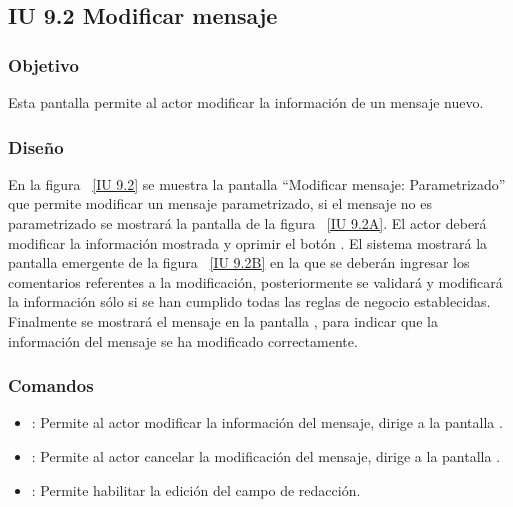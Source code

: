 \subsection{IU 9.2 Modificar mensaje}

\subsubsection{Objetivo}
	
	Esta pantalla permite al actor modificar la información de un mensaje nuevo.

\subsubsection{Diseño}

    En la figura ~\ref{IU 9.2} se muestra la pantalla ``Modificar mensaje: Parametrizado'' que permite modificar un mensaje parametrizado, si el mensaje no es parametrizado se mostrará la pantalla de la figura ~\ref{IU 9.2A}. El actor deberá modificar la información mostrada y oprimir el botón . El sistema mostrará la pantalla emergente de la figura ~\ref{IU 9.2B} en la que se deberán ingresar los comentarios referentes a la modificación, posteriormente se validará y modificará la información sólo si se han cumplido todas las reglas de negocio establecidas. \\
    
    Finalmente se mostrará el mensaje  en la pantalla , para indicar que la información del mensaje
    se ha modificado correctamente.        

	

\subsubsection{Comandos}
\begin{itemize}
	\item {}: Permite al actor modificar la información del mensaje, dirige a la pantalla .
	\item {}: Permite al actor cancelar la modificación del mensaje, dirige a la pantalla .
	\item \btnEditar: Permite habilitar la edición del campo de redacción.
	
\end{itemize}

